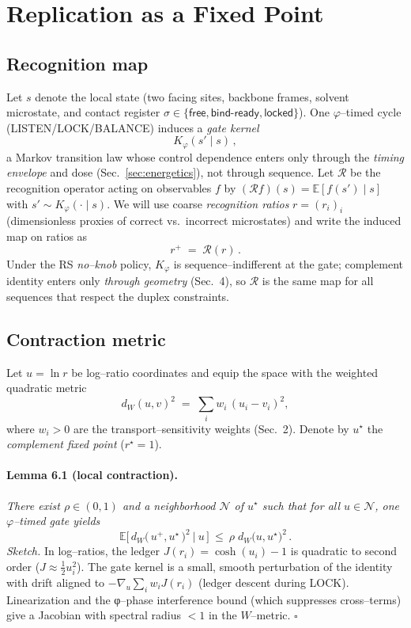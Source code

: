 \documentclass[11pt]{article}
\begin{document}
\section{Replication as a Fixed Point}\label{sec:fixedpoint}

\subsection{Recognition map}\label{sec:recmap}
Let $s$ denote the local state (two facing sites, backbone frames, solvent microstate, and contact register $\sigma\in\{\textsf{free},\textsf{bind-ready},\textsf{locked}\}$). One $\varphi$–timed cycle (LISTEN/LOCK/BALANCE) induces a \emph{gate kernel}
\[
K_\varphi(s'\mid s)\,,
\]
a Markov transition law whose control dependence enters only through the \emph{timing envelope} and dose (Sec.~\ref{sec:energetics}), not through sequence. Let $\mathcal{R}$ be the recognition operator acting on observables $f$ by $(\mathcal{R}f)(s)=\mathbb{E}[f(s')\mid s]$ with $s'\sim K_\varphi(\cdot\mid s)$. We will use coarse \emph{recognition ratios} $r=(r_i)_i$ (dimensionless proxies of correct vs.\ incorrect microstates) and write the induced map on ratios as
\[
r^{+}\;=\;\mathcal{R}(r)\,.
\]
Under the RS \emph{no–knob} policy, $K_\varphi$ is sequence–indifferent at the gate; complement identity enters only \emph{through geometry} (Sec.~4), so $\mathcal{R}$ is the same map for all sequences that respect the duplex constraints.

\subsection{Contraction metric}\label{sec:contraction}
Let $u=\ln r$ be log–ratio coordinates and equip the space with the weighted quadratic metric
\[
d_W(u,v)^2\;=\;\sum_i w_i\,(u_i-v_i)^2,
\]
where $w_i>0$ are the transport–sensitivity weights (Sec.~2). Denote by $u^\star$ the \emph{complement fixed point} ($r^\star\!=\!1$). 

\paragraph{Lemma 6.1 (local contraction).}
\emph{There exist $\rho\in(0,1)$ and a neighborhood $\mathcal{N}$ of $u^\star$ such that for all $u\in\mathcal{N}$, one $\varphi$–timed gate yields}
\[
\mathbb{E}\big[\,d_W\big(\,u^{+},u^\star\,\big)^2\ \big|\ u\,\big]\ \le\ \rho\; d_W\big(u,u^\star\big)^2\,.
\]
\emph{Sketch.} In log–ratios, the ledger $J(r_i)=\cosh(u_i)-1$ is quadratic to second order ($J\approx \tfrac12 u_i^2$). The gate kernel is a small, smooth perturbation of the identity with drift aligned to $-\nabla_u \sum_i w_i J(r_i)$ (ledger descent during LOCK). Linearization and the φ–phase interference bound (which suppresses cross–terms) give a Jacobian with spectral radius $<1$ in the $W$–metric. \hfill$\square$
\end{document}
